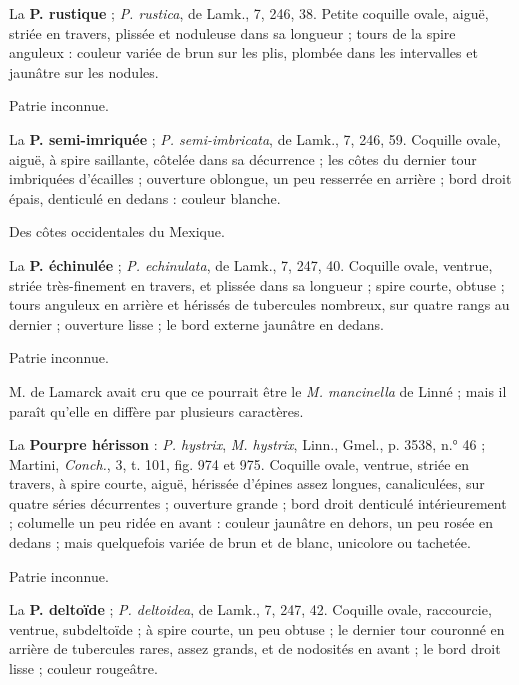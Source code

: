 \documentclass[a4paper, 11pt, oneside, polutonikogreek, french]{article}
\begin{document}
\bigskip

La \textbf{P. rustique} ; \emph{P. rustica}, de Lamk., 7, 246, 38. Petite coquille ovale, aiguë, striée en travers, plissée et noduleuse dans sa longueur ; tours de la spire anguleux : couleur variée de brun sur les plis, plombée dans les intervalles et jaunâtre sur les nodules.

Patrie inconnue.

\bigskip

La \textbf{P. semi-imriquée} ; \emph{P. semi-imbricata}, de Lamk., 7, 246, 59. Coquille ovale, aiguë, à spire saillante, côtelée dans sa décurrence ; les côtes du dernier tour imbriquées d'écailles ; ouverture oblongue, un peu resserrée en arrière ; bord droit épais, denticulé en dedans : couleur blanche.

Des côtes occidentales du Mexique.

\bigskip

La \textbf{P. échinulée} ; \emph{P. echinulata}, de Lamk., 7, 247, 40. Coquille ovale, ventrue, striée très-finement en travers, et plissée dans sa longueur ; spire courte, obtuse ; tours anguleux en arrière et hérissés de tubercules nombreux, sur quatre rangs au dernier ; ouverture lisse ; le bord externe jaunâtre en dedans.

Patrie inconnue.

M. de Lamarck avait cru que ce pourrait être le \emph{M. mancinella} de Linné ; mais il paraît qu'elle en diffère par plusieurs caractères.

\bigskip

La \textbf{Pourpre hérisson} : \emph{P. hystrix}, \emph{M. hystrix}, Linn., Gmel., p. 3538, n.° 46 ; Martini, \emph{Conch.}, 3, t. 101, fig. 974 et 975. Coquille ovale, ventrue, striée en travers, à spire courte, aiguë, hérissée d'épines assez longues, canaliculées, sur quatre séries décurrentes ; ouverture grande ; bord droit denticulé intérieurement ; columelle un peu ridée en avant : couleur jaunâtre en dehors, un peu rosée en dedans ; mais quelquefois variée de brun et de blanc, unicolore ou tachetée.

Patrie inconnue.

\bigskip

La \textbf{P. deltoïde} ; \emph{P. deltoidea}, de Lamk., 7, 247, 42. Coquille ovale, raccourcie, ventrue, subdeltoïde ; à spire courte, un peu obtuse ; le dernier tour couronné en arrière de tubercules rares, assez grands, et de nodosités en avant ; le bord droit lisse ; couleur rougeâtre.
\end{document}
